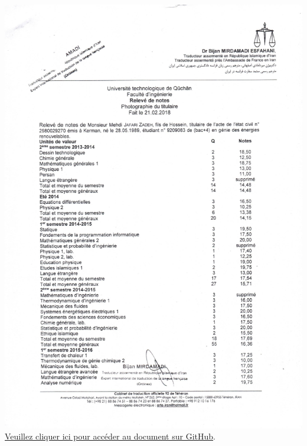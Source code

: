 \documentclass{article}
\begin{document}
    \begin{center}
        \includegraphics[width=\textwidth,height=\textheight,keepaspectratio]{../Document/Education/Renewable Energy Engineering/21-02-2018 releve de notes - Génie énergétique - P01.jpg}
        \small\vspace{0.5em} 
        \href{https://github.com/jafarizadeh/CV---lettre/tree/079f60796b41475881d7ba4a70abc3254d3dd466/Document/Education/Renewable%20Energy%20Engineering}{Veuillez cliquer ici pour accéder au document sur GitHub}.
    \end{center}
\end{document}
